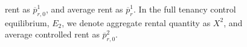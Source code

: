 \documentclass[parskip=full]{article}
\newenvironment{fignote2}[1]
{
\par
\medskip
\begin{minipage}{#1}
\footnotesize
}
{
\end{minipage}
}
\begin{document}
\begin{figure}[H]
\begin{fignote2}{1.0\textwidth}
rent as $\overline{p}^{1}_{r,0}$, and average rent as $\overline{p}^{1}_{r}$. In the full tenancy control equilibrium, $E_{2}$, we denote aggregate rental quantity as $X^{2}$, and average controlled rent as $\overline{p}^{2}_{r,0}$.  
    \end{fignote2}
\end{figure}
    
\newpage


\end{document}
